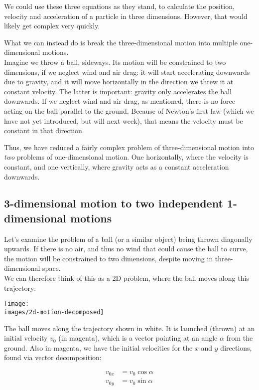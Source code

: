We could use these three equations as they stand, to calculate the position, velocity and acceleration of a particle in three dimensions. However, that would likely get complex very quickly.

What we can instead do is break the three-dimensional motion into multiple one-dimensional motions.\\
Imagine we throw a ball, sideways. Its motion will be constrained to two dimensions, if we neglect wind and air drag: it will start accelerating downwards due to gravity, and it will move horizontally in the direction we threw it at constant velocity. The latter is important: gravity only accelerates the ball downwards. If we neglect wind and air drag, as mentioned, there is no force acting on the ball parallel to the ground. Because of Newton's first law (which we have not yet introduced, but will next week), that means the velocity must be constant in that direction.

Thus, we have reduced a fairly complex problem of three-dimensional motion into \emph{two} problems of one-dimensional motion. One horizontally, where the velocity is constant, and one vertically, where gravity acts as a constant acceleration downwards.

\newpage

\subsection{3-dimensional motion to two independent 1-dimensional motions}

Let's examine the problem of a ball (or a similar object) being thrown diagonally upwards. If there is no air, and thus no wind that could cause the ball to curve, the motion will be constrained to two dimensions, despite moving in three-dimensional space.\\
We can therefore think of this as a 2D problem, where the ball moves along this trajectory:

\begin{center}
\texttt{[image: \\images/2d-motion-decomposed]}
\end{center}

The ball moves along the trajectory shown in white. It is launched (thrown) at an initial velocity $v_0$ (in magenta), which is a vector pointing at an angle $\alpha$ from the ground. Also in magenta, we have the initial velocities for the $x$ and $y$ directions, found via vector decomposition:

\begin{align}
v_{0x} &= v_0 \cos \alpha\\
v_{0y} &= v_0 \sin \alpha
\end{align}

